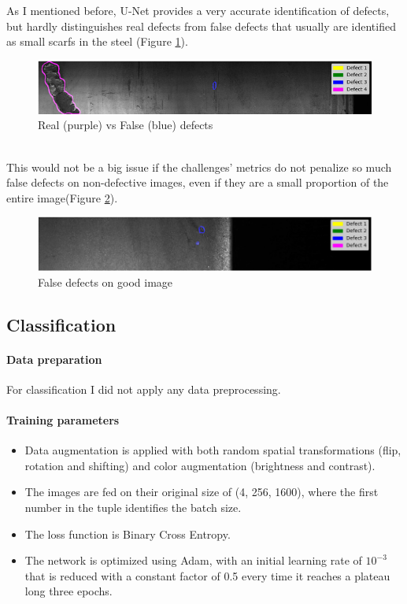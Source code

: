 \documentclass[10pt,twocolumn,letterpaper]{article}
\begin{document}
         As I mentioned before, U-Net provides a very accurate identification of defects, but hardly distinguishes real defects from false defects that usually are identified as small scarfs in the steel (Figure \ref{fig:result1}). 
         \begin{figure}[h]
            \centering
            \caption{Real (purple) vs False (blue) defects} \label{fig:result1}
            \includegraphics[scale=0.5]{Img_Result1.png}
         \end{figure}
         \\This would not be a big issue if the challenges' metrics do not penalize so much false defects on non-defective images, even if they are a small proportion of the entire image(Figure \ref{fig:result2}).  
         \begin{figure}[h]
            \centering
            \caption{False defects on good image} \label{fig:result2}
            \includegraphics[scale=0.355]{Img_Result2.png}
         \end{figure}
   
   \subsection{Classification}
      \paragraph{Data preparation} 
         For classification I did not apply any data preprocessing.
                 
      \paragraph{Training parameters}
      \begin{itemize}
         \item Data augmentation is applied with both random spatial transformations (flip, rotation and shifting) and color augmentation (brightness and contrast).
         \item The images are fed on their original size of (4, 256, 1600), where the first number in the tuple identifies the batch size.
         \item The loss function is Binary Cross Entropy. 
         \item The network is optimized using Adam, with an initial learning rate of $ 10^{-3} $ that is reduced with a constant factor of 0.5 every time it reaches a plateau long three epochs.
      \end{itemize}
\end{document}
